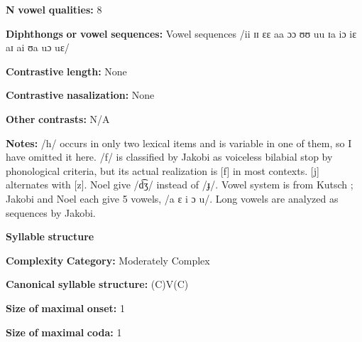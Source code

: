 \begin{styleBody}
\textbf{N} \textbf{vowel} \textbf{qualities:} 8
\end{styleBody}

\begin{styleBody}
\textbf{Diphthongs} \textbf{or} \textbf{vowel} \textbf{sequences:} Vowel sequences /ii ɪɪ ɛɛ aa ɔɔ ʊʊ uu ɪa iɔ iɛ aɪ ai ʊa uɔ uɛ/
\end{styleBody}

\begin{styleBody}
\textbf{Contrastive} \textbf{length:} None
\end{styleBody}

\begin{styleBody}
\textbf{Contrastive} \textbf{nasalization:} None
\end{styleBody}

\begin{styleBody}
\textbf{Other} \textbf{contrasts:} N/A
\end{styleBody}

\begin{styleBody}
\textbf{Notes:} /h/ occurs in only two lexical items and is variable in one of them, so I have omitted it here. /f/ is classified by Jakobi as voiceless bilabial stop by phonological criteria, but its actual realization is [f] in most contexts. [j] alternates with [z]. Noel give /d͡ʒ/ instead of /ɟ/. Vowel system is from Kutsch \citet{LojengaWaag2004}; Jakobi and Noel each give 5 vowels, /a ɛ i ɔ u/. Long vowels are analyzed as sequences by Jakobi.
\end{styleBody}

\begin{styleBody}
\textbf{Syllable} \textbf{structure}
\end{styleBody}

\begin{styleBody}
\textbf{Complexity} \textbf{Category:} Moderately Complex
\end{styleBody}

\begin{styleBody}
\textbf{Canonical} \textbf{syllable} \textbf{structure:} (C)V(C) \citep[53-8]{Jakobi1990}
\end{styleBody}

\begin{styleBody}
\textbf{Size} \textbf{of} \textbf{maximal} \textbf{onset:} 1
\end{styleBody}

\begin{styleBody}
\textbf{Size} \textbf{of} \textbf{maximal} \textbf{coda:} 1
\end{styleBody}

